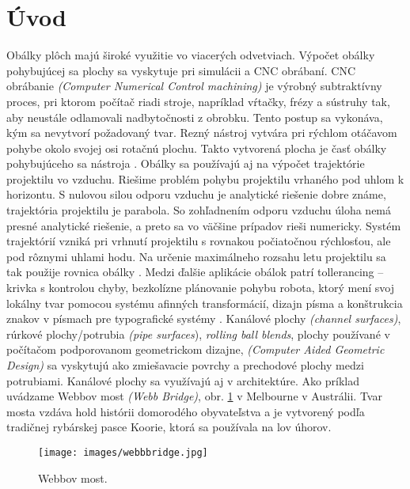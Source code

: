 \chapter*{Úvod} %
Obálky plôch majú široké využitie vo viacerých odvetviach. Výpočet obálky pohybujúcej sa plochy sa vyskytuje pri simulácii a CNC obrábaní. CNC obrábanie \textit{(Computer Numerical Control machining)} je výrobný subtraktívny proces, pri ktorom počítač riadi stroje, napríklad vŕtačky, frézy a sústruhy tak, aby neustále odlamovali nadbytočnosti z obrobku. Tento postup sa vykonáva, kým sa nevytvorí požadovaný tvar. Rezný nástroj vytvára pri rýchlom otáčavom pohybe okolo svojej osi rotačnú plochu. Takto vytvorená plocha je časť obálky pohybujúceho sa nástroja \cite{Skop20}. Obálky sa používajú aj na výpočet trajektórie projektilu vo vzduchu. Riešime problém pohybu projektilu vrhaného pod uhlom k horizontu. S nulovou silou odporu vzduchu je analytické riešenie dobre známe, trajektória projektilu je parabola. So zohľadnením odporu vzduchu úloha nemá presné analytické riešenie, a preto sa vo väčšine prípadov rieši numericky. Systém trajektórií vzniká pri vrhnutí projektilu s rovnakou počiatočnou rýchlosťou, ale pod rôznymi uhlami hodu. Na určenie maximálneho rozsahu letu projektilu sa tak použije rovnica obálky \cite{Chud09}. Medzi ďalšie aplikácie obálok patrí tollerancing – krivka s kontrolou chyby, bezkolízne plánovanie pohybu robota, ktorý mení svoj lokálny tvar pomocou systému afinných transformácií, dizajn písma a konštrukcia znakov v písmach pre typografické systémy \cite{Pott09}. Kanálové plochy \textit{(channel surfaces)}, rúrkové plochy/potrubia \textit{(pipe surfaces}), \textit{rolling ball blends}, plochy používané v počítačom podporovanom geometrickom dizajne, \textit{(Computer Aided Geometric Design)} sa vyskytujú ako zmiešavacie povrchy a prechodové plochy medzi potrubiami. Kanálové plochy sa využívajú aj v architektúre. Ako príklad uvádzame Webbov most \textit{(Webb Bridge)}, obr. \ref{fig:webb_bridge} v Melbourne v Austrálii. Tvar mosta vzdáva hold histórii domorodého obyvateľstva a je vytvorený podľa tradičnej rybárskej pasce Koorie, ktorá sa používala na lov úhorov.

\begin{figure}[h!]
	\centering
	\texttt{[image: images/webbbridge.jpg]}
	\caption[Webbov most.]{Webbov most. \cite{WebbBridge}}
	\label{fig:webb_bridge}
\end{figure}

